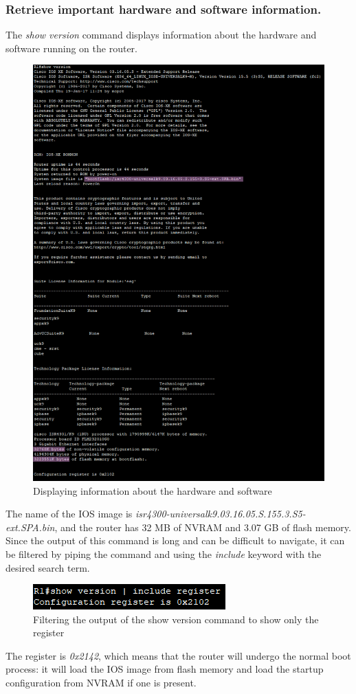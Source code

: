 \documentclass[a4paper]{article}
\newcommand{\abc}{\hfill \break}
\newcommand{\ii}{\textit}
\begin{document}
\subsubsection{Retrieve important hardware and software information.}
The \ii{show version} command displays information about the hardware and software running on the router.
\begin{figure}[h]
	\includegraphics[scale=0.30]{images/showversion.png}
	\centering
	\caption{Displaying information about the hardware and software}
\end{figure}\abc
The name of the IOS image is \ii{isr4300-universalk9.03.16.05.S.155.3.S5-ext.SPA.bin}, and the router has 32 MB of NVRAM and 3.07 GB of flash memory.\newpage\abc
Since the output of this command is long and can be difficult to navigate, it can be filtered by piping the command and using the \ii{include} keyword with the desired search term.
\begin{figure}[h]
	\includegraphics[scale=0.60]{images/grep.png}
	\centering
	\caption{Filtering the output of the show version command to show only the register}
\end{figure}\abc
The register is \ii{0x2142}, which means that the router will undergo the normal boot process: it will load the IOS image from flash memory and load the startup configuration from NVRAM if one is present.\abc
\end{document}
